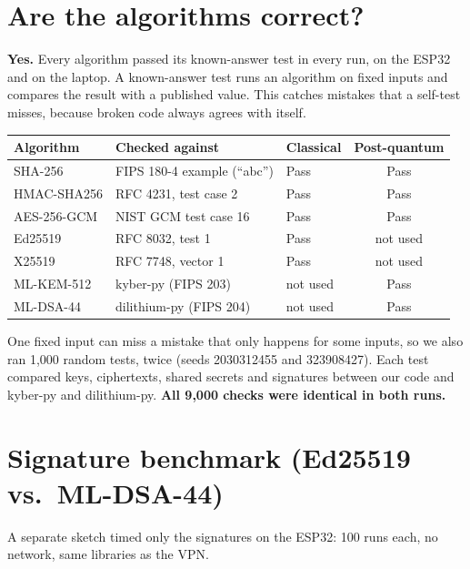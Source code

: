 \documentclass[10pt,a4paper]{article}
\begin{document}
\section{Are the algorithms correct?}

\textbf{Yes.} Every algorithm passed its known-answer test in every run, on the ESP32 and on the laptop.
A known-answer test runs an algorithm on fixed inputs and compares the result with a published value.
This catches mistakes that a self-test misses, because broken code always agrees with itself.

\begin{table}[H]\centering\small
\begin{tabular}{lllc}
\toprule
Algorithm & Checked against & Classical & Post-quantum \\
\midrule
SHA-256 & FIPS 180-4 example (``abc'') & Pass & Pass \\
HMAC-SHA256 & RFC 4231, test case 2 & Pass & Pass \\
AES-256-GCM & NIST GCM test case 16 & Pass & Pass \\
Ed25519 & RFC 8032, test 1 & Pass & not used \\
X25519 & RFC 7748, vector 1 & Pass & not used \\
ML-KEM-512 & kyber-py (FIPS 203) & not used & Pass \\
ML-DSA-44 & dilithium-py (FIPS 204) & not used & Pass \\
\bottomrule
\end{tabular}
\end{table}

One fixed input can miss a mistake that only happens for some inputs, so we also ran 1,000 random
tests, twice (seeds 2030312455 and 323908427). Each test compared keys, ciphertexts, shared secrets and
signatures between our code and kyber-py and dilithium-py. \textbf{All 9,000 checks were identical in
both runs.}

\section{Signature benchmark (Ed25519 vs.\ ML-DSA-44)}\label{sec:sig}

A separate sketch timed only the signatures on the ESP32: 100 runs each, no network, same libraries as
the VPN.
\end{document}
